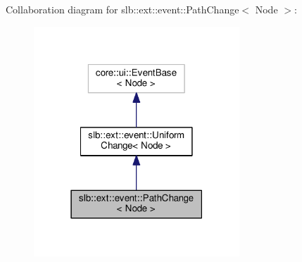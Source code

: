 Collaboration diagram for slb\+:\+:ext\+:\+:event\+:\+:Path\+Change$<$ Node $>$\+:\nopagebreak
\begin{figure}[H]
\begin{center}
\leavevmode
\includegraphics[width=219pt]{structslb_1_1ext_1_1event_1_1PathChange__coll__graph}
\end{center}
\end{figure}
